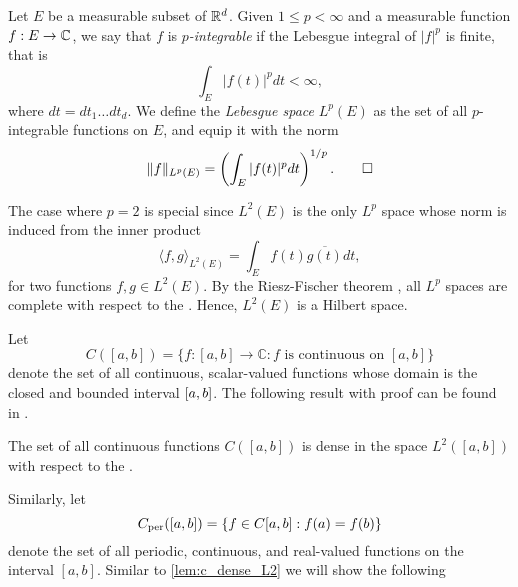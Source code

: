\documentclass[../thesis.tex]{subfiles}
\begin{document}
\begin{definition} %
    Let $E$ be a measurable subset of $\mathbb{R}^d$. Given $1 \leq p < \infty$ and a measurable function $f:E\rightarrow \mathbb{C}$, we say that $f$ is \emph{$p$-integrable} if the Lebesgue integral of $|f|^p$ is finite, that is
    \begin{equation*}
        \int_{E} |f(t)|^p dt < \infty,
    \end{equation*}
    where $dt= dt_1 \dots dt_d$. We define the \emph{Lebesgue space} $L^p(E)$ as the set of all $p$-integrable functions on $E$, and equip it with the norm
    \begin{equation*}
        \|f\|_{L^p(E)} = \left(\int_{E} |f(t)|^p dt\right)^{1/p}. \qedhere
    \end{equation*}
\end{definition}

The case where $p=2$ is special since $L^2(E)$ is the only $L^p$ space whose norm is induced from the inner product
\begin{equation}
    \langle f, g\rangle_{L^2(E)} = \int_{E} f(t)\overline{g(t)} dt,
\end{equation}
for two functions $f,g\in L^2(E)$. By the Riesz-Fischer theorem \cite[p.~279]{heilIntroductionRealAnalysis2019}, all $L^p$ spaces are complete with respect to the \LPnorm. Hence, $L^2(E)$ is a Hilbert space. 



Let
\begin{equation}
    C([a,b]) = \{f:[a,b] \rightarrow \mathbb{C}: f \text{ is continuous on } [a,b]\}
\end{equation}
denote the set of all continuous, scalar-valued functions whose domain is the closed and bounded interval $[a,b]$. The following result with proof can be found in \cite[p.~326]{rudinPrinciplesMathematicalAnalysis20}. 
\begin{lemma}\label{lem:c_dense_L2}
    The set of all continuous functions $C([a,b])$ is dense in the space $L^2([a,b])$ with respect to the \Ltwonorm.
\end{lemma}

Similarly, let
\begin{equation*}
    C_{\text{per}}([a,b])=\{f \in C[a,b]: f(a)=f(b)\}
\end{equation*}
denote the set of all periodic, continuous, and real-valued functions on the interval $[a,b]$. Similar to \cref{lem:c_dense_L2} we will show the following
\end{document}
